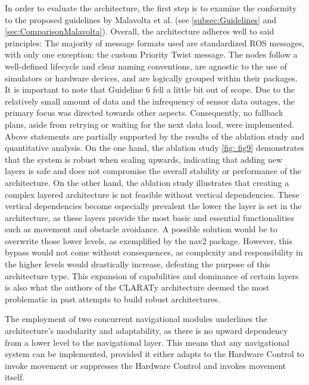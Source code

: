 \documentclass[%
paper=A4,               %
twoside=true,           %
openright,              %
11pt,                   %
bibliography=totoc,     %
titlepage=on,           %
DIV=12,                 %
BCOR=1.5cm,             %
parskip=half,            %
final
]{scrreprt}
\begin{document}
	In order to evaluate the architecture, the first step is to examine the conformity to the proposed guidelines by Malavolta et al. (see \ref{subsec:Guidelines} and \ref{sec:ComparisonMalavolta}). 
	Overall, the architecture adheres well to said principles: The majority of message formats used are standardized ROS messages, with only one exception: the custom Priority Twist message. The nodes follow a well-defined lifecycle and clear naming conventions, are agnostic to the use of simulators or hardware devices, and are logically grouped within their packages. It is important to note that Guideline 6 fell a little bit out of scope. Due to the relatively small amount of data and the infrequency of sensor data outages, the primary focus was directed towards other aspects. Consequently, no fallback plans, aside from retrying or waiting for the next data load, were implemented.
	Above statements are partially supported by the results of the ablation study and quantitative analysis. On the one hand, the ablation study \ref{fig: fig9} demonstrates that the system is robust when scaling upwards, indicating that adding new layers is safe and does not compromise the overall stability or performance of the architecture. On the other hand, the ablation study illustrates that creating a complex layered architecture is not feasible without vertical dependencies. These vertical dependencies become especially prevalent the lower the layer is set in the architecture, as these layers provide the most basic and essential functionalities such as movement and obstacle avoidance. A possible solution would be to overwrite those lower levels, as exemplified by the nav2 package. However, this bypass would not come without consequences, as complexity and responsibility in the higher levels would drastically increase, defeating the purpose of this architecture type. This expansion of capabilities and dominance of certain layers is also what the authors of the CLARATy architecture deemed the most problematic in past attempts to build robust architectures. \newline
	
	The employment of two concurrent navigational modules underlines the architecture's modularity and adaptability, as there is no upward dependency from a lower level to the navigational layer. This means that any navigational system can be implemented, provided it either adapts to the Hardware Control to invoke movement or suppresses the Hardware Control and invokes movement itself. \newline 
	
\end{document}
